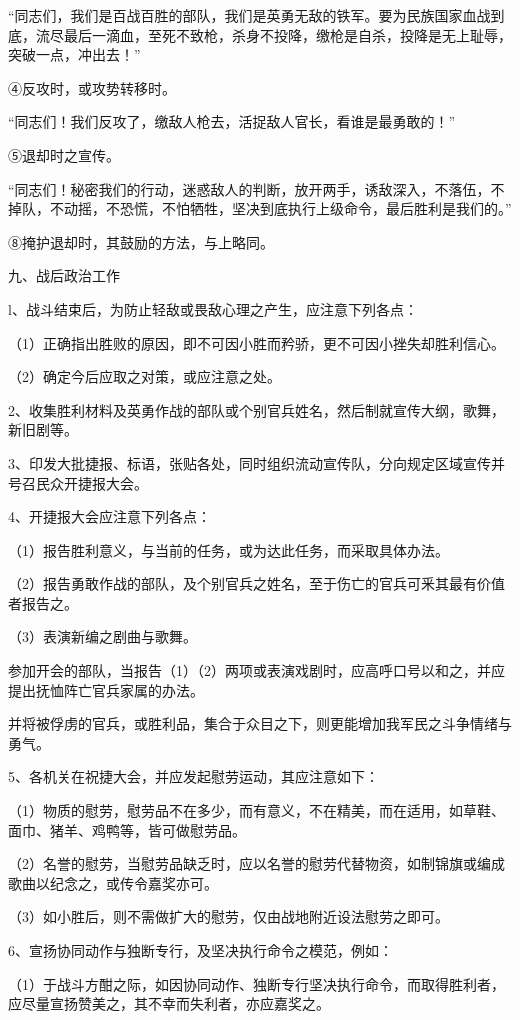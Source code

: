 “同志们，我们是百战百胜的部队，我们是英勇无敌的铁军。要为民族国家血战到底，流尽最后一滴血，至死不致枪，杀身不投降，缴枪是自杀，投降是无上耻辱，突破一点，冲出去！”

④反攻时，或攻势转移时。

“同志们！我们反攻了，缴敌人枪去，活捉敌人官长，看谁是最勇敢的！”

⑤退却时之宣传。

“同志们！秘密我们的行动，迷惑敌人的判断，放开两手，诱敌深入，不落伍，不掉队，不动摇，不恐慌，不怕牺牲，坚决到底执行上级命令，最后胜利是我们的。”

⑧掩护退却时，其鼓励的方法，与上略同。

九、战后政治工作

l、战斗结束后，为防止轻敌或畏敌心理之产生，应注意下列各点：

（1）正确指出胜败的原因，即不可因小胜而矜骄，更不可因小挫失却胜利信心。


（2）确定今后应取之对策，或应注意之处。

2、收集胜利材料及英勇作战的部队或个别官兵姓名，然后制就宣传大纲，歌舞，新旧剧等。

3、印发大批捷报、标语，张贴各处，同时组织流动宣传队，分向规定区域宣传并号召民众开捷报大会。

4、开捷报大会应注意下列各点：

（1）报告胜利意义，与当前的任务，或为达此任务，而采取具体办法。

（2）报告勇敢作战的部队，及个别官兵之姓名，至于伤亡的官兵可釆其最有价值者报告之。

（3）表演新编之剧曲与歌舞。

参加开会的部队，当报告（1）（2）两项或表演戏剧时，应高呼口号以和之，并应提出抚恤阵亡官兵家属的办法。

并将被俘虏的官兵，或胜利品，集合于众目之下，则更能增加我军民之斗争情绪与勇气。

5、各机关在祝捷大会，并应发起慰劳运动，其应注意如下：

（1）物质的慰劳，慰劳品不在多少，而有意义，不在精美，而在适用，如草鞋、面巾、猪羊、鸡鸭等，皆可做慰劳品。

（2）名誉的慰劳，当慰劳品缺乏时，应以名誉的慰劳代替物资，如制锦旗或编成歌曲以纪念之，或传令嘉奖亦可。

（3）如小胜后，则不需做扩大的慰劳，仅由战地附近设法慰劳之即可。

6、宣扬协同动作与独断专行，及坚决执行命令之模范，例如：

（1）于战斗方酣之际，如因协同动作、独断专行坚决执行命令，而取得胜利者，应尽量宣扬赞美之，其不幸而失利者，亦应嘉奖之。

